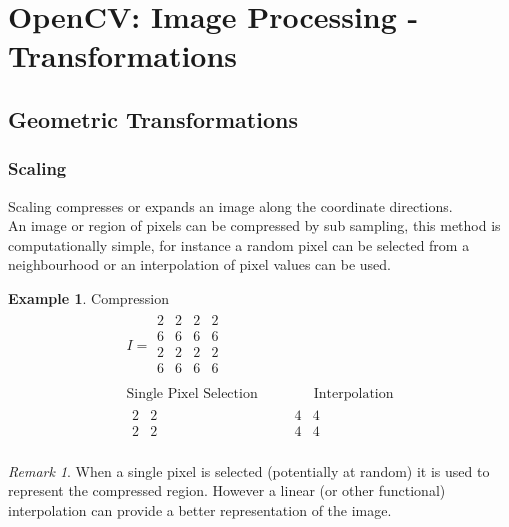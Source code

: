 \documentclass{article}
\theoremstyle{definition}
\newtheorem{ex}{Example}[subsection]
\theoremstyle{remark}
\newtheorem*{rem}{Remark}
\begin{document}
\break


\section{OpenCV: Image Processing - Transformations}


\subsection{Geometric Transformations}

\subsubsection{Scaling}

Scaling compresses or expands an image along the coordinate directions.\\


\noindent An image or region of pixels can be compressed by sub sampling, this method is computationally simple, for instance a random pixel can be selected from a neighbourhood or an interpolation of pixel values can be used.

\begin{ex} Compression
\begin{gather*}
    I = \begin{matrix}
	2 & 2 & 2 & 2 \\
	6 & 6 & 6 & 6 \\
	2 & 2 & 2 & 2 \\
	6 & 6 & 6 & 6 \\
    \end{matrix}  \\
    \text{Single Pixel Selection} \qquad  \qquad
\text{Interpolation} \\
    \begin{matrix}
	2 & 2  \\
	2 & 2  \\
    \end{matrix} \qquad \qquad \qquad \qquad \quad
    \begin{matrix}
	4 & 4  \\
	4 & 4  \\
    \end{matrix} 
\end{gather*}
\end{ex}

\begin{rem}
    When a single pixel is selected (potentially at random) it is used to represent the compressed region. However a linear (or other functional) interpolation can provide a better representation of the image.
\end{rem}
\end{document}
